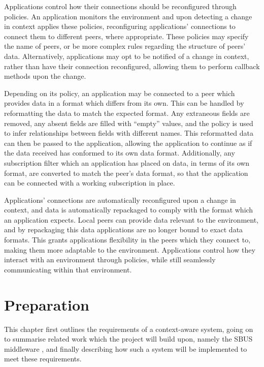 \documentclass[12pt,twoside,notitlepage]{report}
\begin{document}
Applications control how their connections should be reconfigured through policies. 
An application monitors the environment and upon detecting a change in context applies these policies, reconfiguring applications' connections to connect them to different peers, where appropriate.
These policies may specify the name of peers, or be more complex rules regarding the structure of peers' data. 
Alternatively, applications may opt to be notified of a change in context, rather than have their connection reconfigured, allowing them to perform callback methods upon the change.

Depending on its policy, an application may be connected to a peer which provides data in a format which differs from its own.
This can be handled by reformatting the data to match the expected format. 
Any extraneous fields are removed, any absent fields are filled with ``empty'' values, and the policy is used to infer relationships between fields with different names. 
This reformatted data can then be passed to the application, allowing the application to continue as if the data received has conformed to its own data format. 
Additionally, any subscription filter which an application has placed on data, in terms of its own format, are converted to match the peer's data format, so that the application can be connected with a working subscription in place. 


Applications' connections are automatically reconfigured upon a change in context, and data is automatically repackaged to comply with the format which an application expects. 
Local peers can provide data relevant to the environment, and by repackaging this data applications are no longer bound to exact data formats. 
This grants applications flexibility in the peers which they connect to, making them more adaptable to the environment. 
Applications control how they interact with an environment through policies, while still seamlessly communicating within that environment.

\cleardoublepage

 
\chapter{Preparation}

This chapter first outlines the requirements of a context-aware system, going on to summarise related work which the project will build upon, namely the SBUS middleware \cite{ingram2009reconfigurable}, and finally describing how such a system will be implemented to meet these requirements.
\end{document}
